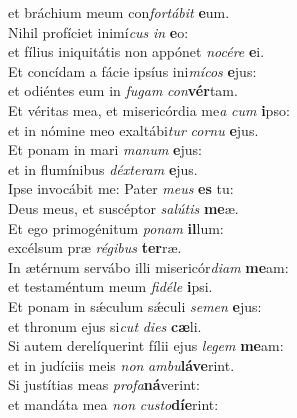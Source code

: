 \oddverse et bráchium meum con\textit{for}\textit{tá}\textit{bit} \textbf{e}um.\\
\evenverse Nihil profíciet inimí\textit{cus} \textit{in} \textbf{e}o:~\*\\
\evenverse et fílius iniquitátis non appónet \textit{no}\textit{cé}\textit{re} \textbf{e}i.\\
\oddverse Et concídam a fácie ipsíus ini\textit{mí}\textit{cos} \textbf{e}jus:~\*\\
\oddverse et odiéntes eum in \textit{fu}\textit{gam} \textit{con}\textbf{vér}tam.\\
\evenverse Et véritas mea, et misericórdia me\textit{a} \textit{cum} \textbf{i}pso:~\*\\
\evenverse et in nómine meo exaltábi\textit{tur} \textit{cor}\textit{nu} \textbf{e}jus.\\
\oddverse Et ponam in mari \textit{ma}\textit{num} \textbf{e}jus:~\*\\
\oddverse et in flumínibus \textit{déx}\textit{te}\textit{ram} \textbf{e}jus.\\
\evenverse Ipse invocábit me: Pater \textit{me}\textit{us} \textbf{es} tu:~\*\\
\evenverse Deus meus, et suscéptor \textit{sa}\textit{lú}\textit{tis} \textbf{me}æ.\\
\oddverse Et ego primogénitum \textit{po}\textit{nam} \textbf{il}lum:~\*\\
\oddverse excélsum præ \textit{ré}\textit{gi}\textit{bus} \textbf{ter}ræ.\\
\evenverse In ætérnum servábo illi misericór\textit{di}\textit{am} \textbf{me}am:~\*\\
\evenverse et testaméntum meum \textit{fi}\textit{dé}\textit{le} \textbf{i}psi.\\
\oddverse Et ponam in sǽculum sǽculi \textit{se}\textit{men} \textbf{e}jus:~\*\\
\oddverse et thronum ejus si\textit{cut} \textit{di}\textit{es} \textbf{cæ}li.\\
\evenverse Si autem derelíquerint fílii ejus \textit{le}\textit{gem} \textbf{me}am:~\*\\
\evenverse et in judíciis meis \textit{non} \textit{am}\textit{bu}\textbf{lá}\textbf{ve}rint.\\
\oddverse Si justítias meas \textit{pro}\textit{fa}\textbf{ná}verint:~\*\\
\oddverse et mandáta mea \textit{non} \textit{cu}\textit{sto}\textbf{dí}\textbf{e}rint:\\
